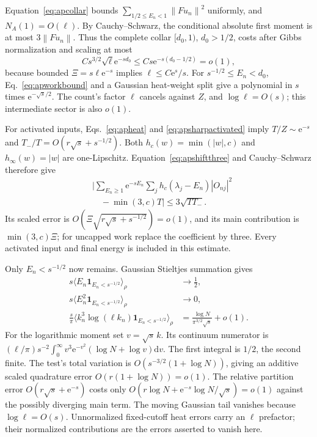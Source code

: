 \documentclass[aps,pra,reprint,superscriptaddress,longbibliography]{revtex4-2}
\newcommand{\dd}{\mathrm d}
\newcommand{\ee}{\mathrm e}
\newcommand{\norm}[1]{\left\lVert#1\right\rVert}
\newcommand{\one}{\mathbf 1}
\begin{document}
Equation~\eqref{eq:apcollar} bounds
$\sum_{1/2\le E_n<1}\norm{Fu_n}^2$ uniformly, and $N_A(1)=O(\ell)$.
By Cauchy--Schwarz, the conditional absolute first moment is at most
$3\norm{Fu_n}$. Thus the complete collar $[d_0,1)$, $d_0>1/2$,
costs after Gibbs normalization and scaling at most
\begin{equation}
 Cs^{3/2}\sqrt\ell\ee^{-sd_0}
       \le Cs\ee^{-s(d_0-1/2)}=o(1),                      \label{eq:apworkcollar}
\end{equation}
because bounded $\Xi=s\ell\ee^{-s}$ implies $\ell\le C\ee^s/s$.
For $s^{-1/2}\le E_n<d_0$, Eq.~\eqref{eq:apworkbound} and a
Gaussian heat-weight split give a polynomial in $s$ times
$\ee^{-\sqrt s/2}$. The count's factor $\ell$ cancels against $Z$,
and $\log\ell=O(s)$; this intermediate sector is also $o(1)$.

For activated inputs, Eqs.~\eqref{eq:apheat} and
\eqref{eq:apsharpactivated} imply $T/Z\sim\ee^{-s}$ and
$T_-/T=O(r\sqrt s+s^{-1/2})$. Both $h_c(w)=\min(|w|,c)$ and
$h_\infty(w)=|w|$ are one-Lipschitz. Equation~\eqref{eq:apshiftthree}
and Cauchy--Schwarz therefore give
\begin{equation}
 \begin{aligned}
 &\Big|\sum_{E_n\ge1}\ee^{-sE_n}\sum_jh_c(\lambda_j-E_n)|O_{nj}|^2\\
 &\quad-\min(3,c)T\Big|\le3\sqrt{TT_-}.
 \end{aligned}                                         \label{eq:apactivatedwork}
\end{equation}
Its scaled error is $O(\Xi\sqrt{r\sqrt s+s^{-1/2}})=o(1)$, and
its main contribution is $\min(3,c)\Xi$; for uncapped work replace
the coefficient by three. Every activated input and final energy
is included in this estimate.

Only $E_n<s^{-1/2}$ now remains. Gaussian Stieltjes summation gives
\begin{align}
 s\langle E_n\one_{E_n<s^{-1/2}}\rangle_\rho&\to\tfrac12,
 \nonumber\\
 s\langle E_n^2\one_{E_n<s^{-1/2}}\rangle_\rho&\to0,\nonumber\\
 \frac s\pi\langle k_n^3\log(\ell k_n)
                    \one_{E_n<s^{-1/2}}\rangle_\rho
     &=\frac{\log N}{\pi^{3/2}\sqrt s}+o(1).              \label{eq:aplogmoment}
\end{align}
For the logarithmic moment set $v=\sqrt s\,k$. Its continuum numerator
is $(\ell/\pi)s^{-2}\int_0^\infty v^3\ee^{-v^2}
(\log N+\log v)\dd v$. The first integral is $1/2$, the second
finite. The test's total variation is
$O(s^{-3/2}(1+\log N))$, giving an additive scaled quadrature error
$O(r(1+\log N))=o(1)$. The relative partition error
$O(r\sqrt s+\ee^{-s})$ costs only
$O(r\log N+\ee^{-s}\log N/\sqrt s)=o(1)$ against the possibly
diverging main term. The moving Gaussian tail vanishes because
$\log\ell=O(s)$. Unnormalized fixed-cutoff heat errors carry an
$\ell$ prefactor; their normalized contributions are the errors
asserted to vanish here.
\end{document}
